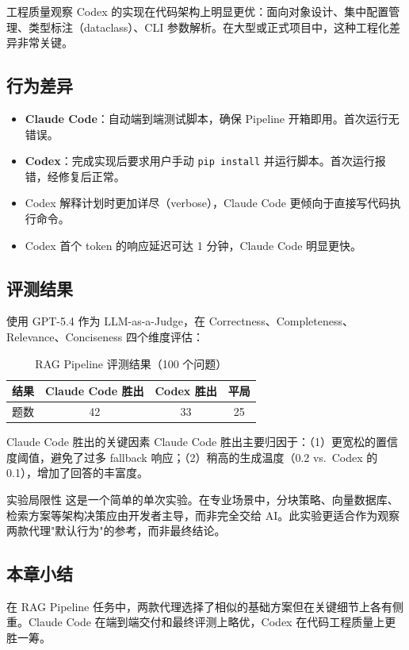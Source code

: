 \begin{knowledgebox}{工程质量观察}
Codex 的实现在代码架构上明显更优：面向对象设计、集中配置管理、类型标注（dataclass）、CLI 参数解析。在大型或正式项目中，这种工程化差异非常关键。
\end{knowledgebox}

\subsection{行为差异}

\begin{itemize}
    \item \textbf{Claude Code}：自动端到端测试脚本，确保 Pipeline 开箱即用。首次运行无错误。
    \item \textbf{Codex}：完成实现后要求用户手动 \texttt{pip install} 并运行脚本。首次运行报错，经修复后正常。
    \item Codex 解释计划时更加详尽（verbose），Claude Code 更倾向于直接写代码执行命令。
    \item Codex 首个 token 的响应延迟可达 1 分钟，Claude Code 明显更快。
\end{itemize}

\subsection{评测结果}

使用 GPT-5.4 作为 LLM-as-a-Judge，在 Correctness、Completeness、Relevance、Conciseness 四个维度评估：

\begin{table}[H]
\centering
\caption{RAG Pipeline 评测结果（100 个问题）}
\begin{tabular}{lccc}
\toprule
\textbf{结果} & \textbf{Claude Code 胜出} & \textbf{Codex 胜出} & \textbf{平局} \\
\midrule
题数 & 42 & 33 & 25 \\
\bottomrule
\end{tabular}
\end{table}

\begin{importantbox}{Claude Code 胜出的关键因素}
Claude Code 胜出主要归因于：（1）更宽松的置信度阈值，避免了过多 fallback 响应；（2）稍高的生成温度（0.2 vs.\ Codex 的 0.1），增加了回答的丰富度。
\end{importantbox}

\begin{warningbox}{实验局限性}
这是一个简单的单次实验。在专业场景中，分块策略、向量数据库、检索方案等架构决策应由开发者主导，而非完全交给 AI。此实验更适合作为观察两款代理"默认行为"的参考，而非最终结论。
\end{warningbox}

\subsection{本章小结}

在 RAG Pipeline 任务中，两款代理选择了相似的基础方案但在关键细节上各有侧重。Claude Code 在端到端交付和最终评测上略优，Codex 在代码工程质量上更胜一筹。

